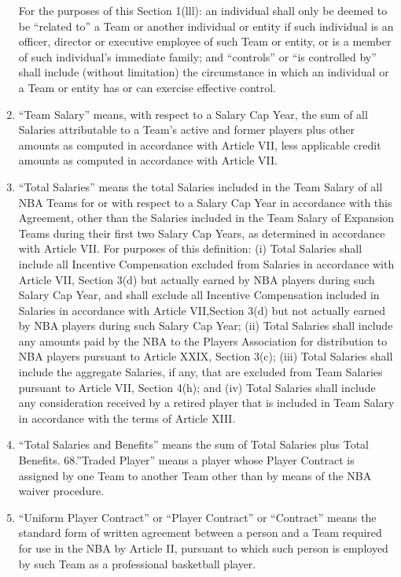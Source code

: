 \documentclass[
]{book}
\begin{document}
\begin{enumerate}
  For the purposes of this Section 1(lll): an individual shall only be deemed to be ``related to'' a Team or another individual or entity if such individual is an officer, director or executive employee of such Team or entity, or is a member of such individual's immediate family; and ``controls'' or ``is controlled by'' shall include (without limitation) the circumstance in which an individual or a Team or entity has or can exercise effective control.
\item
  ``Team Salary'' means, with respect to a Salary Cap Year, the sum of all Salaries attributable to a Team's active and former players plus other amounts as computed in accordance with Article VII, less applicable credit amounts as computed in accordance with Article VII.
\item
  ``Total Salaries'' means the total Salaries included in the Team Salary of all NBA Teams for or with respect to a Salary Cap Year in accordance with this Agreement, other than the Salaries included in the Team Salary of Expansion Teams during their first two Salary Cap Years, as determined in accordance with Article VII. For purposes of this definition: (i) Total Salaries shall include all Incentive Compensation excluded from Salaries in accordance with Article VII, Section 3(d) but actually earned by NBA players during such Salary Cap Year, and shall exclude all Incentive Compensation included in Salaries in accordance with Article VII,Section 3(d) but not actually earned by NBA players during such Salary Cap Year; (ii) Total Salaries shall include any amounts paid by the NBA to the Players Association for distribution to NBA players pursuant to Article XXIX, Section 3(c); (iii) Total Salaries shall include the aggregate Salaries, if any, that are excluded from Team Salaries pursuant to Article VII, Section 4(h); and (iv) Total Salaries shall include any consideration received by a retired player that is included in Team Salary in accordance with the terms of Article XIII.
\item
  ``Total Salaries and Benefits'' means the sum of Total Salaries plus Total Benefits.
  68.''Traded Player'' means a player whose Player Contract is assigned by one Team to another Team other than by means of the NBA waiver procedure.
\item
  ``Uniform Player Contract'' or ``Player Contract'' or ``Contract'' means the standard form of written agreement between a person and a Team required for use in the NBA by Article II, pursuant to which such person is employed by such Team as a professional basketball player.

\end{enumerate}
\end{document}
